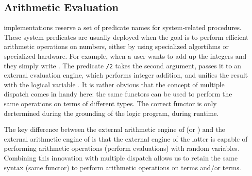 \subsection{Arithmetic Evaluation}\label{sec:arithmetic}


\prologsty implementations reserve a set of predicate names for system-related procedures. These system predicates are usually deployed when the goal is to perform efficient arithmetic operations on numbers, either by using specialized algortihms or specialized hardware. For example, when a user wants to add up the integers  and  they simply write . The predicate \lstinline[columns=fixed]|/2| takes the second argument, passes it to an external evaluation engine, which performs integer addition, and unifies the result with the logical variable . It is rather obvious that the concept of multiple dispatch comes in handy here: the same functors can be used to perform the same operations on terms of different types. The correct functor is only dertermined during the grounding of the logic program, \ie during runtime.

The key difference between the external arithmetic engine of \prologsty (or \problogsty) and the external arithmetic engine of \dcproblogsty is that the external engine of the latter is capable of performing arithmetic operations (perform evaluations) with random variables. Combining this innovation with multiple dispatch allows us to retain the same syntax (same functor) to perform arithmetic operations on  terms and/or  terms.


